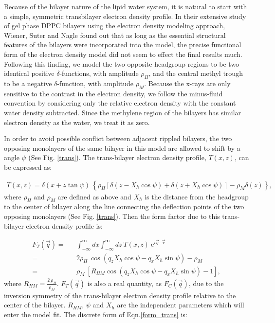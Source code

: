 Because of the bilayer nature of the lipid water system, it is natural 
to start with a simple, symmetric transbilayer electron density profile. 
In their extensive study of gel phase DPPC bilayers using the electron
density modeling approach, Wiener, Suter and Nagle \cite{WSN89} found
out that as long as the essential structural features of the bilayers
were incorporated into the model, the precise functional form of the
electron density model did not seem to effect the final results much.
Following this finding, we model the two opposite headgroup regions to be 
two identical positive $\delta$-functions, with amplitude $\rho_H$, and
the central methyl trough to be a negative $\delta$-function, with amplitude
$\rho_M$. Because the x-rays are only sensitive to the contrast in the
electron density, we follow the minus-fluid convention by considering
only the relative electron density with the constant water density
subtracted. Since the methylene region of the bilayers has similar
electron density as the water, we treat it as zero.

In order to avoid possible conflict between adjacent rippled bilayers,
the two opposing monolayers of the same bilayer in this model are allowed 
to shift by a angle $\psi$ (See Fig. \ref{trans}). The trans-bilayer 
electron density profile, $T(x,z)$, can be expressed as:

\begin{eqnarray}
\label{transbi}
T(x,z) = \delta (x + z \tan \psi)\ \left\{ \rho_H [\delta (z-X_h\cos \psi)
+\delta (z+X_h \cos \psi)]-\rho_M \delta (z) \right\},
\end{eqnarray}
where $\rho_H$ and $\rho_M$ are defined as above and 
$X_h$ is the distance from the headgroup to the center of bilayer along
the line connecting the deflection points of the two opposing monolayers
(See Fig. \ref{trans}). Then the form factor due to this trans-bilayer 
electron density profile is:

\begin{eqnarray}
\label{form_trans}
F_T (\vec{q}) =&& \int_{- \infty}^{\infty} dx \int_{- \infty}^{\infty} dz
\ T(x,z) \ \mbox{e}^{i \vec{q} \cdot \vec{r}} \nonumber\\
=&& 2 \rho_H\ \cos (q_z X_h \cos \psi - q_x X_h \sin \psi) - \rho_M \nonumber\\
=&& \rho_M\ [R_{HM} \cos (q_z X_h \cos \psi - q_x X_h \sin \psi) -1],
\end{eqnarray}
where \(R_{HM} = \frac{2\ \rho_H}{ \rho_M}\). $F_T (\vec{q})$ is also
a real quantity, as $F_C (\vec{q})$, due to the inversion symmetry of the
trans-bilayer electron density profile relative to the center of the bilayer.
$R_{HM}$, $\psi$ and $X_h$ are the independent parameters which will enter
the model fit. The discrete form of Eqn.\ref{form_trans} is:

